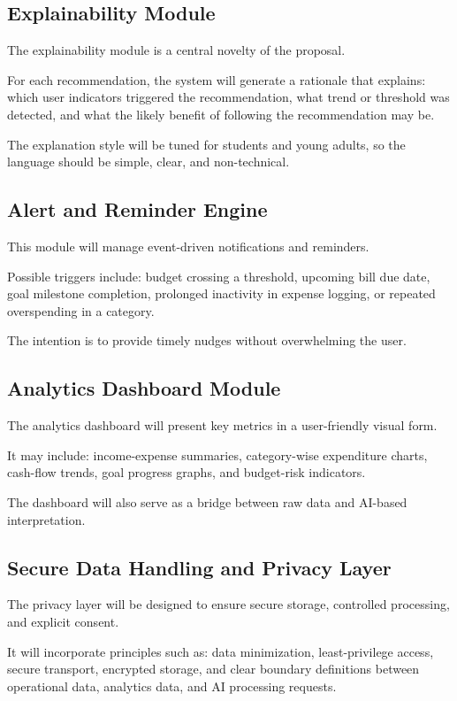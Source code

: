 \documentclass[12pt,a4paper]{report}
\begin{document}
\subsection{Explainability Module}
The explainability module is a central novelty of the proposal.

For each recommendation,
the system will generate a rationale that explains:
which user indicators triggered the recommendation,
what trend or threshold was detected,
and what the likely benefit of following the recommendation may be.

The explanation style will be tuned for students and young adults,
so the language should be simple,
clear,
and non-technical.

\subsection{Alert and Reminder Engine}
This module will manage event-driven notifications and reminders.

Possible triggers include:
budget crossing a threshold,
upcoming bill due date,
goal milestone completion,
prolonged inactivity in expense logging,
or repeated overspending in a category.

The intention is to provide timely nudges without overwhelming the user.

\subsection{Analytics Dashboard Module}
The analytics dashboard will present key metrics in a user-friendly visual form.

It may include:
income-expense summaries,
category-wise expenditure charts,
cash-flow trends,
goal progress graphs,
and budget-risk indicators.

The dashboard will also serve as a bridge between raw data and AI-based interpretation.

\subsection{Secure Data Handling and Privacy Layer}
The privacy layer will be designed to ensure secure storage,
controlled processing,
and explicit consent.

It will incorporate principles such as:
data minimization,
least-privilege access,
secure transport,
encrypted storage,
and clear boundary definitions between operational data,
analytics data,
and AI processing requests.
\end{document}
